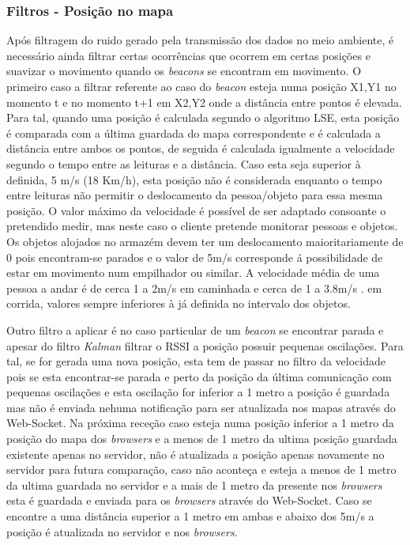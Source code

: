 \subsubsection{Filtros - Posição no mapa}

\par Após filtragem do ruido gerado pela transmissão dos dados no meio ambiente, é necessário ainda filtrar certas ocorrências que ocorrem em certas posições e suavizar o movimento quando os \textit{beacons} se encontram em movimento. O primeiro caso a filtrar referente ao caso do \textit{beacon} esteja numa posição X1,Y1 no momento t e no momento t+1 em X2,Y2 onde a distância entre pontos é elevada. Para tal, quando uma posição é calculada segundo o algoritmo LSE, esta posição é comparada com a última guardada do mapa correspondente e é calculada a distância entre ambos os pontos, de seguida é calculada igualmente a velocidade segundo o tempo entre as leituras e a distância. Caso esta seja superior à definida, 5 m/s (18 Km/h), esta posição não é considerada enquanto o tempo entre leituras não permitir o deslocamento da pessoa/objeto para essa mesma posição. O valor máximo da velocidade é possível de ser adaptado consoante o pretendido medir, mas neste caso o cliente pretende monitorar pessoas e objetos. Os objetos alojados no armazém devem ter um deslocamento maioritariamente de 0 pois encontram-se parados e o valor de 5m/s corresponde á possibilidade de estar em movimento num empilhador ou similar. A velocidade média de uma pessoa a andar é de cerca 1 a 2m/s em caminhada\cite{walkingSpeed} e cerca de 1 a 3.8m/s \cite{Long2013}. em corrida, valores sempre inferiores à já definida no intervalo dos objetos.
\par Outro filtro a aplicar é no caso particular de um \textit{beacon} se encontrar parada e apesar do filtro \textit{Kalman} filtrar o RSSI a posição possuir pequenas oscilações. Para tal, se for gerada uma nova posição, esta tem de passar no filtro da velocidade pois se esta encontrar-se parada e perto da posição da última comunicação com pequenas oscilações e esta oscilação for inferior a 1 metro a posição é guardada mas não é enviada nehuma notificação para ser atualizada nos mapas através do Web-Socket. Na próxima receção caso esteja numa posição inferior a 1 metro da posição do mapa dos \textit{browsers} e a menos de 1 metro da ultima posição guardada existente apenas no servidor, não é atualizada a posição apenas novamente no servidor para futura comparação, caso não aconteça e esteja a menos de 1 metro da ultima guardada no servidor e a mais de 1 metro da presente nos \textit{browsers} esta é guardada e enviada para os \textit{browsers} através do Web-Socket. Caso se encontre a uma distância superior a 1 metro em ambas e abaixo dos 5m/s a posição é atualizada no servidor e nos \textit{browsers}.

